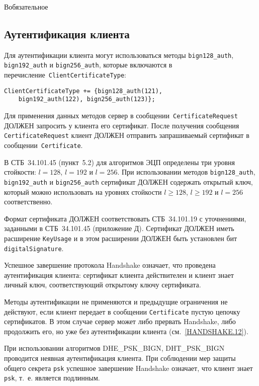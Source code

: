 \begin{appendix}{В}{обязательное}
\subsection{Аутентификация клиента}\label{BSUITES.3.2}

Для аутентификации клиента могут использоваться методы
\mbox{\lstinline{bign128_auth},} \lstinline{bign192_auth} и
\lstinline{bign256_auth}, которые включаются в 
перечисление~\lstinline{ClientCertificateType}: 
\begin{lstlisting}
ClientCertificateType += {bign128_auth(121), 
    bign192_auth(122), bign256_auth(123)};
\end{lstlisting}

Для применения данных методов сервер в сообщении~\lstinline{CertificateRequest} 
ДОЛЖЕН запросить у клиента его сертификат. После получения сообщения 
\lstinline{CertificateRequest} клиент ДОЛЖЕН отправить запрашиваемый сертификат 
в сообщении~\lstinline{Certificate}.  

В СТБ~34.101.45 (пункт~5.2) для алгоритмов ЭЦП определены три уровня 
стойкости: $l = 128$, $l = 192$ и $l = 256$. При использовании методов 
\lstinline{bign128_auth}, \lstinline{bign192_auth} и 
\lstinline{bign256_auth} сертификат ДОЛЖЕН содержать открытый ключ, 
который можно использовать на уровнях стойкости $l \geq 128$,  
$l\geq 192$ и $l = 256$ соответственно.  

Формат сертификата ДОЛЖЕН соответствовать СТБ~34.101.19 с уточнениями, 
заданными в СТБ~34.101.45 (приложение Д). Сертификат ДОЛЖЕН иметь 
расширение \lstinline{KeyUsage} и в этом расширении ДОЛЖЕН быть установлен бит 
\lstinline{digitalSignature}. 

Успешное завершение протокола Handshake означает, что проведена 
аутентификация клиента: сертификат клиента действителен и клиент знает 
личный ключ, соответствующий открытому ключу сертификата. 

Методы аутентификации не применяются и предыдущие ограничения не 
действуют, если клиент передает в сообщении \lstinline{Certificate} пустую цепочку 
сертификатов. В этом случае сервер может либо прервать Handshake, либо 
продолжить его, но уже без аутентификации клиента (см.~\ref{HANDSHAKE.12}). 

При использовании алгоритмов DHE\_PSK\_BIGN, DHT\_PSK\_BIGN проводится неявная 
аутентификация клиента. При соблюдении мер защиты общего секрета \lstinline{psk} 
успешное завершение Handshake означает, что клиент знает \lstinline{psk}, 
т.~е. является подлинным. 


\end{appendix}
